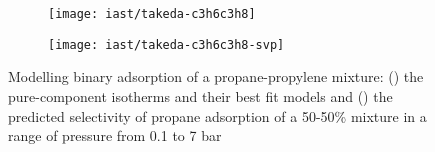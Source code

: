 \begin{figure}[htb]

    \centering
    \begin{subfigure}[b]{.45\textwidth}
        \texttt{[image: iast/takeda-c3h6c3h8]}
        \caption{}%
        \label{pyg:fig:takedac3h6c3h8iso}
    \end{subfigure}
    \begin{subfigure}[b]{.45\textwidth}
        \texttt{[image: iast/takeda-c3h6c3h8-svp]}
        \caption{}%
        \label{pyg:fig:takedac3h6c3h8iast}
    \end{subfigure}
    \caption{%
    Modelling binary adsorption of a propane-propylene mixture: 
    (\protect{}) the pure-component
    isotherms and their best fit models and 
    (\protect{})
    the predicted selectivity of propane adsorption 
    of a 50-50\% mixture in a range of pressure from 0.1 to 7 bar}%
    \label{pyg:fig:takedac3h6c3h8}

\end{figure}